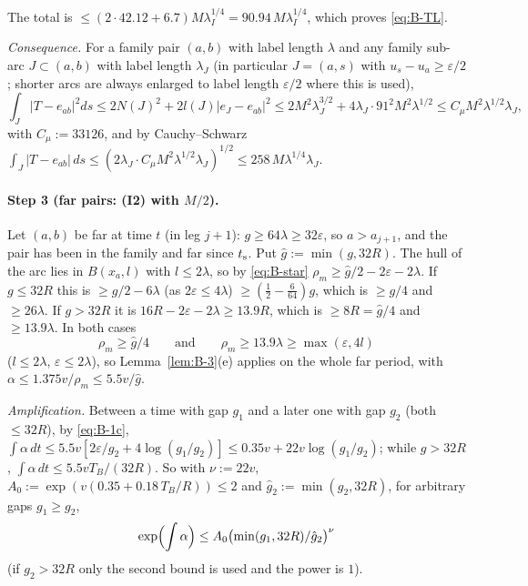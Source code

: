 The total is $\le(2\cdot42.12+6.7)M\lambda_I^{1/4}=90.94\,M\lambda_I^{1/4}$, which proves \eqref{eq:B-TL}.

\emph{Consequence.} For a family pair $(a,b)$ with label length $\lambda$ and any family sub-arc $J\subset(a,b)$ with label length
$\lambda_J$ (in particular $J=(a,s)$ with $u_s-u_a\ge\varepsilon/2$; shorter arcs are always enlarged to label length
$\varepsilon/2$ where this is used),
\begin{equation}\label{eq:B-mu}
\int_J|T-e_{ab}|^2ds\le2N(J)^2+2l(J)|e_J-e_{ab}|^2\le2M^2\lambda_J^{3/2}+4\lambda_J\cdot91^2M^2\lambda^{1/2}
\le C_\mu M^2\lambda^{1/2}\lambda_J,
\end{equation}
with $C_\mu:=33126$, and by Cauchy--Schwarz
$\int_J|T-e_{ab}|\,ds\le(2\lambda_J\cdot C_\mu M^2\lambda^{1/2}\lambda_J)^{1/2}\le258\,M\lambda^{1/4}\lambda_J$.

\paragraph{Step 3 (far pairs: (I2) with $M/2$).}
Let $(a,b)$ be far at time $t$ (in leg $j+1$): $g\ge64\lambda\ge32\varepsilon$, so $a>a_{j+1}$, and the pair has been in the family
and far since $t_{\mathrm s}$. Put $\hat g:=\min(g,32R)$. The hull of the arc lies in $B(x_a,l)$ with $l\le2\lambda$, so by \eqref{eq:B-star}
$\rho_m\ge\hat g/2-2\varepsilon-2\lambda$. If $g\le32R$ this is $\ge g/2-6\lambda$ (as $2\varepsilon\le4\lambda$)
$\ge(\frac12-\frac6{64})g$, which is $\ge g/4$ and $\ge26\lambda$. If $g>32R$ it is $16R-2\varepsilon-2\lambda\ge13.9R$, which is
$\ge8R=\hat g/4$ and $\ge13.9\lambda$. In both cases
\[
\rho_m\ge\hat g/4\qquad\text{and}\qquad\rho_m\ge13.9\lambda\ge\max(\varepsilon,4l)
\]
($l\le2\lambda$, $\varepsilon\le2\lambda$), so Lemma~\ref{lem:B-3}(e) applies on the whole far period, with
$\alpha\le1.375v/\rho_m\le5.5v/\hat g$.

\emph{Amplification.} Between a time with gap $g_1$ and a later one with gap $g_2$ (both $\le32R$), by \eqref{eq:B-1c},
$\int\alpha\,dt\le5.5v[2\varepsilon/g_2+4\log(g_1/g_2)]\le0.35v+22v\log(g_1/g_2)$; while $g>32R$,
$\int\alpha\,dt\le5.5vT_B/(32R)$. So with $\nu:=22v$, $A_0:=\exp(v(0.35+0.18\,T_B/R))\le2$ and
$\hat g_2:=\min(g_2,32R)$, for arbitrary gaps $g_1\ge g_2$,
\[
\exp\Bigl(\int\alpha\Bigr)\le A_0\bigl(\min(g_1,32R)/\hat g_2\bigr)^\nu
\]
(if $g_2>32R$ only the second bound is used and the power is $1$).

